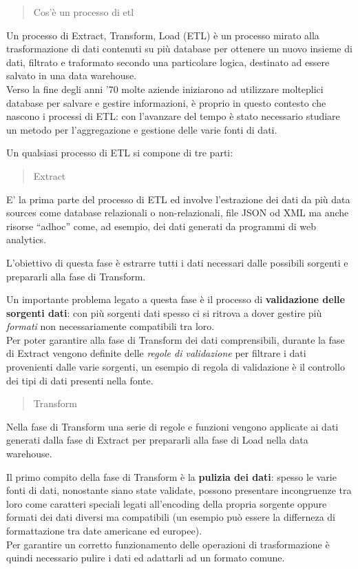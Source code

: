 \documentclass[]{article}
\begin{document}
\begin{quote}
Cos'è un processo di etl
\end{quote}

Un processo di Extract, Transform, Load (ETL) è un processo mirato alla
trasformazione di dati contenuti su più database per ottenere un nuovo
insieme di dati, filtrato e traformato secondo una particolare logica,
destinato ad essere salvato in una data warehouse.\\
Verso la fine degli anni '70 molte aziende iniziarono ad utilizzare
molteplici database per salvare e gestire informazioni, è proprio in
questo contesto che nascono i processi di ETL: con l'avanzare del tempo
è stato necessario studiare un metodo per l'aggregazione e gestione
delle varie fonti di dati.

Un qualsiasi processo di ETL si compone di tre parti:

\begin{quote}
Extract
\end{quote}

E' la prima parte del processo di ETL ed involve l'estrazione dei dati
da più data sources come database relazionali o non-relazionali, file
JSON od XML ma anche risorse ``adhoc'' come, ad esempio, dei dati
generati da programmi di web analytics.

L'obiettivo di questa fase è estrarre tutti i dati necessari dalle
possibili sorgenti e prepararli alla fase di Transform.

Un importante problema legato a questa fase è il processo di
\textbf{validazione delle sorgenti dati}: con più sorgenti dati spesso
ci si ritrova a dover gestire più \emph{formati} non necessariamente
compatibili tra loro.\\
Per poter garantire alla fase di Transform dei dati comprensibili,
durante la fase di Extract vengono definite delle \emph{regole di
validazione} per filtrare i dati provenienti dalle varie sorgenti, un
esempio di regola di validazione è il controllo dei tipi di dati
presenti nella fonte.

\begin{quote}
Transform
\end{quote}

Nella fase di Transform una serie di regole e funzioni vengono applicate
ai dati generati dalla fase di Extract per prepararli alla fase di Load
nella data warehouse.

Il primo compito della fase di Transform è la \textbf{pulizia dei dati}:
spesso le varie fonti di dati, nonostante siano state validate, possono
presentare incongruenze tra loro come caratteri speciali legati
all'encoding della propria sorgente oppure formati dei dati diversi ma
compatibili (un esempio può essere la differneza di formattazione tra
date americane ed europee).\\
Per garantire un corretto funzionamento delle operazioni di
trasformazione è quindi necessario pulire i dati ed adattarli ad un
formato comune.
\end{document}
